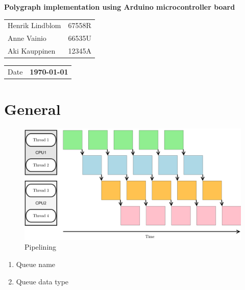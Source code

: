 \documentclass[a4paper,11pt]{article}
\begin{document}
\begin{titlepage}
\pagestyle{empty}
\begin{center}

\vspace*{3cm}
\noindent\LARGE{\textbf{
%
Polygraph implementation using Arduino microcontroller board
%
}}
\\
\vspace*{1cm}
\large{
\begin{tabular}{l l}
%
Henrik Lindblom & 67558R \\
Anne Vainio & 66535U \\
Aki Kauppinen & 12345A
%
\end{tabular}

\vspace*{1cm}
\begin{tabular}{l l}
Date & \textbf{
%
\today 
%
}
\end{tabular}
}
\end{center}
\end{titlepage}
\tableofcontents
\newpage
{}
\section{General}
\begin{figure}[htb]
  \includegraphics[width=\textwidth]{pipelining2}
  \caption{Pipelining}
  \label{fig:pipelining}
\end{figure}
\begin{enumerate}
\item Queue name
\item Queue data type
\end{enumerate}
\end{document}

